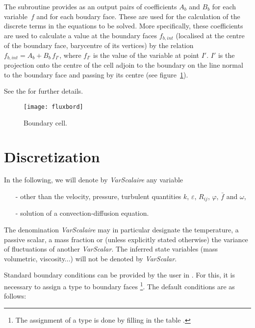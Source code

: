 The  subroutine
provides as an output pairs of coefficients
$A_b$ and $B_b$
for each variable~$f$ and for each boudary face.
These are used for the calculation of the discrete terms in the equations
to be solved. More specifically, these coefficients are used to calculate
a value at the boundary faces $f_{b,int}$ (localised at the centre of the
boundary face, barycentre of its vertices) by the relation
 $f_{b,int} = A_b+B_b\,f_{I'}$, where $f_{I'}$ is the value of the variable
at point $I'$. $I'$ is the projection onto the centre of the cell
adjoin to the boundary on the line normal to the boundary face and passing
by its centre
(see figure~\ref{Base_Condli_fig_flux_condli}).

See the  for further details.

\begin{figure}[h]
\centerline{\texttt{[image: fluxbord]}}
\caption{\label{Base_Condli_fig_flux_condli}Boundary cell.}
\end{figure}

\section*{Discretization}

In the following, we will denote by {\it VarScalaire} any variable
\begin{itemize}
\item [-] other than the
velocity, pressure, turbulent quantities $k$, $\varepsilon$,
$R_{ij}$, $\varphi$, $\bar{f}$ and $\omega$,

\item [-] solution of a convection-diffusion equation.
\end{itemize}
The denomination {\it VarScalaire} may in particular designate
the temperature, a passive scalar,
a mass fraction or (unless explicitly stated otherwise) the variance of fluctuations
of another {\it VarScalar}. The inferred state variables (mass
volumetric, viscosity...) will not be denoted by {\it VarScalar}.


Standard boundary conditions can be provided by
the user in . For this, it is necessary to assign a
type to boundary faces \footnote{The assignment of a type is done
by filling in the table
.}. The default conditions are as follows:

